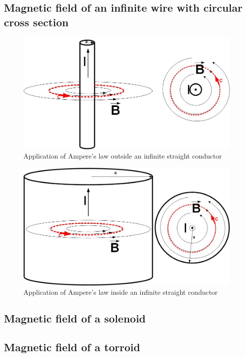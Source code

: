 \documentclass{ximera}
\begin{document}
\begin{example}
\subsection{Magnetic field of an infinite wire with circular cross section}





\begin{figure}[htbp]
\begin{center}
\includegraphics[scale=0.5]{../jpg/Ampere's_Law1.jpg}
\end{center}
\caption{Application of Ampere's law outside an infinite straight conductor}
\label{MutualInduc}
\end{figure}




\begin{figure}[htbp]
\begin{center}
\includegraphics[scale=0.5]{../jpg/Ampere's_Law2.jpg}
\end{center}
\caption{Application of Ampere's law inside an infinite straight conductor}
\label{MutualInduc}
\end{figure}




\end{example}

\begin{example}
\subsection{Magnetic field of a solenoid}

\end{example}


\begin{example}
\subsection{Magnetic field of a torroid}

\end{example}
\end{document}
